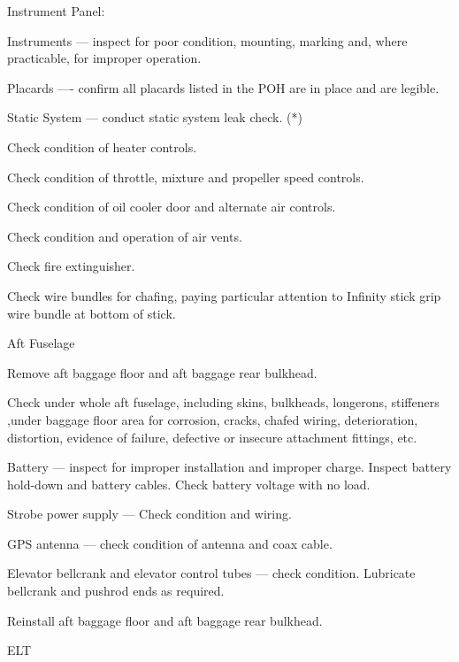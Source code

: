 \begin{enumerate*}
\begin{enumerate*}
		\item Instrument Panel:
  	\begin{enumerate*}
  		\item Instruments --- inspect for poor condition, mounting, marking and, where practicable, for improper operation.
  		\item Placards ---- confirm all placards listed in the POH are in place and are legible.
  		\item Static System --- conduct static system leak check. (*)
      \end{enumerate*}
		\item Check condition of heater controls.
		\item Check condition of throttle, mixture and propeller speed controls.
		\item Check condition of oil cooler door and alternate air controls.
		\item Check condition and operation of air vents.
		\item Check fire extinguisher.
		\item Check wire bundles for chafing, paying particular attention to Infinity stick grip wire bundle at bottom of stick.
	\end{enumerate*}
	\item{Aft Fuselage} 
	\begin{enumerate*}
		\item Remove aft baggage floor and aft baggage rear bulkhead. 
		\item Check under whole aft fuselage, including skins, bulkheads, longerons, stiffeners ,under baggage floor area for corrosion, cracks, chafed wiring, deterioration, distortion, evidence of failure, defective or insecure attachment fittings, etc.
		\item Battery --- inspect for improper installation and improper charge.  Inspect battery hold-down and battery cables.  Check battery voltage with no load.
		\item Strobe power supply --- Check condition and wiring.
		\item GPS antenna --- check condition of antenna and coax cable.
		\item Elevator bellcrank and elevator control tubes --- check condition.  Lubricate bellcrank and pushrod ends as required. 
		\item Reinstall aft baggage floor and aft baggage rear bulkhead. 
	\end{enumerate*}
  \item{ELT} 
  \begin{enumerate*}

\end{enumerate*}
\end{enumerate*}
